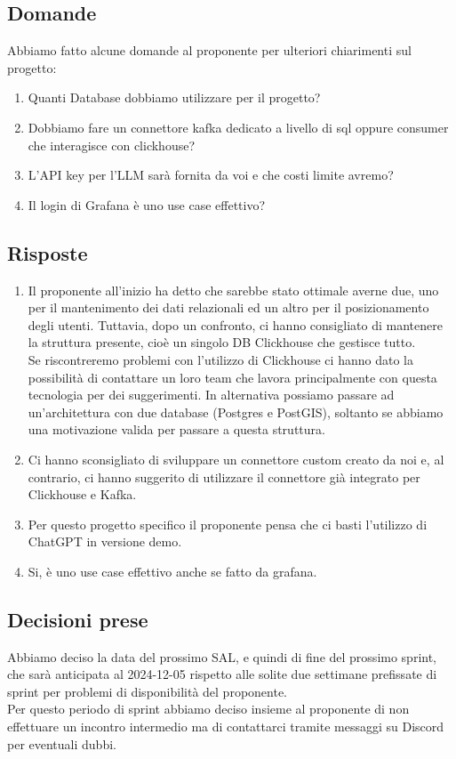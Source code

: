 \documentclass[12pt]{article}
\begin{document}
\subsection{Domande}
Abbiamo fatto alcune domande al proponente per ulteriori chiarimenti sul progetto:\\
\begin{enumerate}
\item Quanti Database dobbiamo utilizzare per il progetto?
\item Dobbiamo fare un connettore kafka dedicato a livello di sql oppure consumer che interagisce con clickhouse?
\item L'API key per l'LLM sarà fornita da voi e che costi limite avremo?
\item Il login di Grafana è uno use case effettivo?
\end{enumerate}
\subsection{Risposte}
\begin{enumerate}
\item Il proponente all'inizio ha detto che sarebbe stato ottimale averne due, uno per il mantenimento dei dati relazionali ed un altro per il posizionamento degli utenti. Tuttavia, dopo un confronto, ci hanno consigliato di mantenere la struttura presente, cioè un singolo DB Clickhouse che gestisce tutto.\\
Se riscontreremo problemi con l'utilizzo di Clickhouse ci hanno dato la possibilità di contattare un loro team che lavora principalmente con questa tecnologia per dei suggerimenti. In alternativa possiamo passare ad un'architettura con due database (Postgres e PostGIS), soltanto se abbiamo una motivazione valida per passare a questa struttura.
\item Ci hanno sconsigliato di sviluppare un connettore custom creato da noi e, al contrario, ci hanno suggerito di utilizzare il connettore già integrato per Clickhouse e Kafka.
\item Per questo progetto specifico il proponente pensa che ci basti l'utilizzo di ChatGPT in versione demo.
\item Si, è uno use case effettivo anche se fatto da grafana.
\end{enumerate}

\subsection{Decisioni prese}
Abbiamo deciso la data del prossimo SAL, e quindi di fine del prossimo sprint, che sarà anticipata al 2024-12-05 rispetto alle solite due settimane prefissate di sprint per problemi di disponibilità del proponente.\\
Per questo periodo di sprint abbiamo deciso insieme al proponente di non effettuare un incontro intermedio ma di contattarci tramite messaggi su Discord per eventuali dubbi. 
\end{document}
